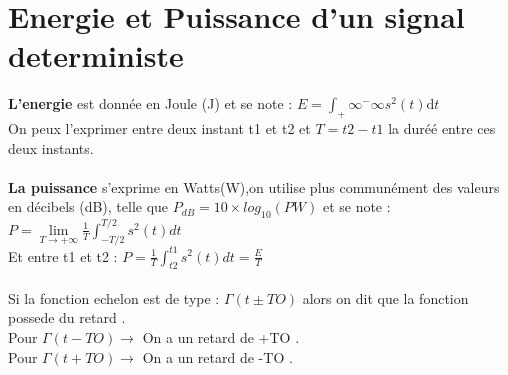 \documentclass[a4paper,8pt,openany]{book}
\begin{document}
\section{Energie et Puissance d'un signal deterministe}
\textbf{L'energie} est donn\'ee en Joule (J) et se note : $E = \int_+\infty^-\infty s^2(t) \mathrm dt$\\
On peux l'exprimer entre deux instant t1 et t2 et $T=t2-t1$ la duréé entre ces deux instants.\\
\\
\textbf{La puissance} s'exprime en Watts(W),on utilise plus commun\'ement des valeurs en décibels (dB),
telle que $P_{dB} = 10 \times log_10 (PW)$ et se note : $P=\lim\limits_{T \rightarrow +\infty}\frac{1}{T}\int_{-T/2}^{T/2} s^2(t)dt$\\
Et entre t1 et t2 : $P=\frac{1}{T} \int_{t2}^{t1} s^2(t)dt=\frac{E}{T}$\\
\\


Si la fonction echelon est de type : $\Gamma(t \pm TO)$ alors on dit que la fonction possede du retard .\\
Pour $\Gamma(t - TO) \rightarrow $ On a un retard de +TO .\\
Pour $\Gamma(t + TO) \rightarrow $ On a un retard de -TO .\\
\end{document}

